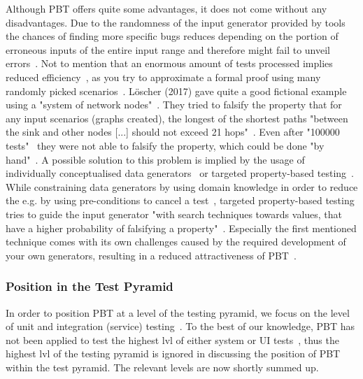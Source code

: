 \documentclass[runningheads]{llncs}
\begin{document}
Although PBT offers quite some advantages, it does not come without any disadvantages. Due to the randomness of the input generator provided by tools the chances of finding more specific bugs reduces depending on the portion of erroneous inputs of the entire input range and therefore might fail to unveil errors~\cite{Loescher2017,Padhye2019,ElazarMittelman2023,Shi2023}. Not to mention that an enormous amount of tests processed implies reduced efficiency~\cite{ElazarMittelman2023,Shi2023}, as you try to approximate a formal proof using many randomly picked scenarios~\cite{Fink1997,ElazarMittelman2023,Paraskevopoulou2015}. Löscher (2017) gave quite a good fictional example using a "system of network nodes"~\cite{Loescher2017}. They tried to falsify the property that for any input scenarios (graphs created), the longest of the shortest paths "between the sink and other nodes [...] should not exceed 21 hops"~\cite{Loescher2017}. Even after "100000 tests"~\cite{Loescher2017} they were not able to falsify the property, which could be done "by hand"~\cite{Loescher2017}. A possible solution to this problem is implied by the usage of individually conceptualised data generators~\cite{Loescher2017,ElazarMittelman2023,Shi2023,Paraskevopoulou2015,Claessen2000} or targeted property-based testing~\cite{Loescher2017}. While constraining data generators by using domain knowledge in order to reduce the e.g. by using pre-conditions to cancel a test~\cite{Loescher2017,ElazarMittelman2023,Shi2023}, targeted property-based testing tries to guide the input generator "with search techniques towards values, that have a higher probability of falsifying a property"~\cite{Loescher2017}. Especially the first mentioned technique comes with its own challenges caused by the required development of your own generators, resulting in a reduced attractiveness of PBT~\cite{Loescher2017,ElazarMittelman2023,Shi2023}.

\subsubsection{Position in the Test Pyramid}
In order to position PBT at a level of the testing pyramid, we focus on the level of unit and integration (service) testing~\cite{Aniche2022,Radziwill2020}. To the best of our knowledge, PBT has not been applied to test the highest lvl of either system or UI tests~\cite{Radziwill2020,Aniche2022}, thus the highest lvl of the testing pyramid is ignored in discussing the position of PBT within the test pyramid. The relevant levels are now shortly summed up.
\end{document}

